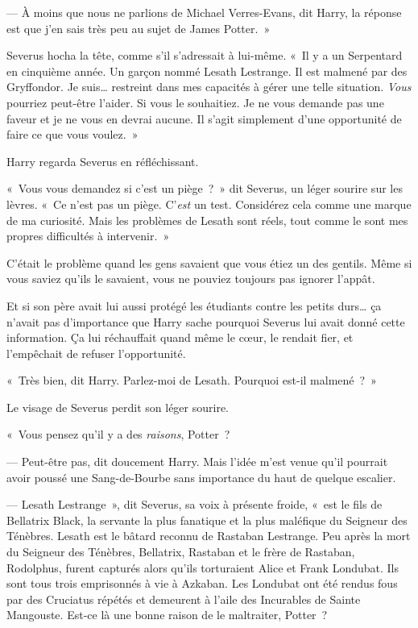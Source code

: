 --- À moins que nous ne parlions de Michael Verres-Evans, dit Harry, la réponse est que j'en sais très peu au sujet de James Potter.~»

Severus hocha la tête, comme s'il s'adressait à lui-même. «~Il y a un Serpentard en cinquième année. Un garçon nommé Lesath Lestrange. Il est malmené par des Gryffondor. Je suis… restreint dans mes capacités à gérer une telle situation. \emph{Vous} pourriez peut-être l'aider. Si vous le souhaitiez. Je ne vous demande pas une faveur et je ne vous en devrai aucune. Il s'agit simplement d'une opportunité de faire ce que vous voulez.~»

Harry regarda Severus en réfléchissant.

«~Vous vous demandez si c'est un piège~?~» dit Severus, un léger sourire sur les lèvres. «~Ce n'est pas un piège. C'\emph{est} un test. Considérez cela comme une marque de ma curiosité. Mais les problèmes de Lesath sont réels, tout comme le sont mes propres difficultés à intervenir.~»

C'était le problème quand les gens savaient que vous étiez un des gentils. Même si vous saviez qu'ils le savaient, vous ne pouviez toujours pas ignorer l'appât.

Et si son père avait lui aussi protégé les étudiants contre les petits durs… ça n'avait pas d'importance que Harry sache pourquoi Severus lui avait donné cette information. Ça lui réchauffait quand même le cœur, le rendait fier, et l'empêchait de refuser l'opportunité.

«~Très bien, dit Harry. Parlez-moi de Lesath. Pourquoi est-il malmené~?~»

Le visage de Severus perdit son léger sourire.

«~Vous pensez qu'il y a des \emph{raisons}, Potter~?

--- Peut-être pas, dit doucement Harry. Mais l'idée m'est venue qu'il pourrait avoir poussé une Sang-de-Bourbe sans importance du haut de quelque escalier.

--- Lesath Lestrange~», dit Severus, sa voix à présente froide, «~est le fils de Bellatrix Black, la servante la plus fanatique et la plus maléfique du Seigneur des Ténèbres. Lesath est le bâtard reconnu de Rastaban Lestrange. Peu après la mort du Seigneur des Ténèbres, Bellatrix, Rastaban et le frère de Rastaban, Rodolphus, furent capturés alors qu'ils torturaient Alice et Frank Londubat. Ils sont tous trois emprisonnés à vie à Azkaban. Les Londubat ont été rendus fous par des Cruciatus répétés et demeurent à l'aile des Incurables de Sainte Mangouste. Est-ce là une bonne raison de le maltraiter, Potter~?

